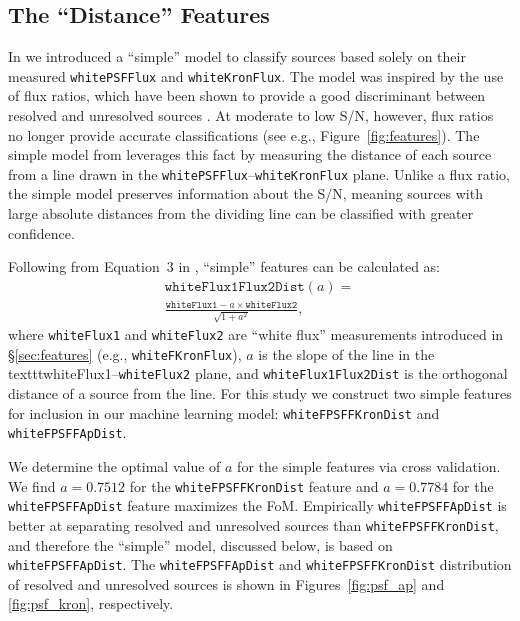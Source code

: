 \documentclass[twocolumn]{aastex63}
\begin{document}
\subsection{The ``Distance'' Features}\label{sec:simple_model}

In \citet{Tachibana18} we introduced a ``simple'' model to classify sources
based solely on their measured \texttt{whitePSFFlux} and
\texttt{whiteKronFlux}. The model was inspired by the use of flux ratios,
which have been shown to provide a good discriminant between resolved and
unresolved sources \citep[e.g., the SDSS morphological \texttt{CLASS}
parameter][]{Lupton01}. At moderate to low S/N, however, flux ratios no longer
provide accurate classifications (see e.g., Figure~\ref{fig:features}). The
simple model from \citet{Tachibana18} leverages this fact by measuring the
distance of each source from a line drawn in the
\texttt{whitePSFFlux}--\texttt{whiteKronFlux} plane. Unlike a flux ratio, the
simple model preserves information about the S/N, meaning sources with large
absolute distances from the dividing line can be classified with greater
confidence.

Following from Equation~3 in \citet{Tachibana18}, ``simple'' features can be
calculated as:
%
\begin{multline}
 \mathtt{whiteFlux1Flux2Dist}(a) = \\
 \frac{\mathtt{whiteFlux1} - a\times\mathtt{whiteFlux2}}{ \sqrt{1 + a^2}},
 \label{eqn:simple_feat}
\end{multline}
%
where \texttt{whiteFlux1} and \texttt{whiteFlux2} are ``white flux''
measurements introduced in \S\ref{sec:features} (e.g.,
\texttt{whiteFKronFlux}), $a$ is the slope of the line in the
texttt{whiteFlux1}--\texttt{whiteFlux2} plane, and
\texttt{whiteFlux1Flux2Dist} is the orthogonal distance of a source from the
line. For this study we construct two simple features for inclusion in our
machine learning model: \texttt{whiteFPSFFKronDist} and
\texttt{whiteFPSFFApDist}.

We determine the optimal value of $a$ for the simple features via cross
validation. We find $a = 0.7512$ for the \texttt{whiteFPSFFKronDist} feature
and $a = 0.7784$ for the \texttt{whiteFPSFFApDist} feature maximizes the FoM.
Empirically \texttt{whiteFPSFFApDist} is better at separating resolved and
unresolved sources than \texttt{whiteFPSFFKronDist}, and therefore the
``simple'' model, discussed below, is based on \texttt{whiteFPSFFApDist}. The
\texttt{whiteFPSFFApDist} and \texttt{whiteFPSFFKronDist} distribution of
resolved and unresolved sources is shown in Figures~\ref{fig:psf_ap} and
\ref{fig:psf_kron}, respectively.
\end{document}
